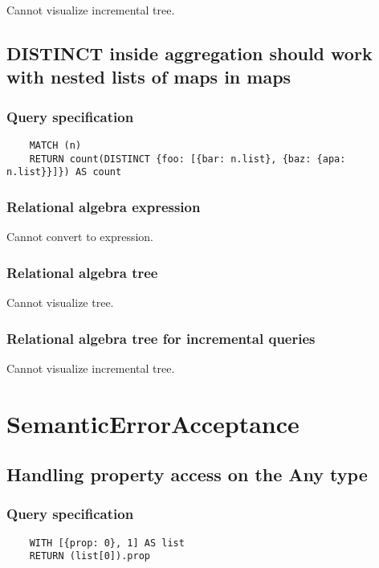 	Cannot visualize incremental tree.
	\subsection{DISTINCT inside aggregation should work with nested lists of maps in maps}

	\subsubsection*{Query specification}

	\begin{lstlisting}
	MATCH (n)
	RETURN count(DISTINCT {foo: [{bar: n.list}, {baz: {apa: n.list}}]}) AS count
	\end{lstlisting}


	\subsubsection*{Relational algebra expression}

	Cannot convert to expression.

	\subsubsection*{Relational algebra tree}

	Cannot visualize tree.

	\subsubsection*{Relational algebra tree for incremental queries}

	Cannot visualize incremental tree.

	\section{SemanticErrorAcceptance}

	\subsection{Handling property access on the Any type}

	\subsubsection*{Query specification}

	\begin{lstlisting}
	WITH [{prop: 0}, 1] AS list
	RETURN (list[0]).prop
	\end{lstlisting}


